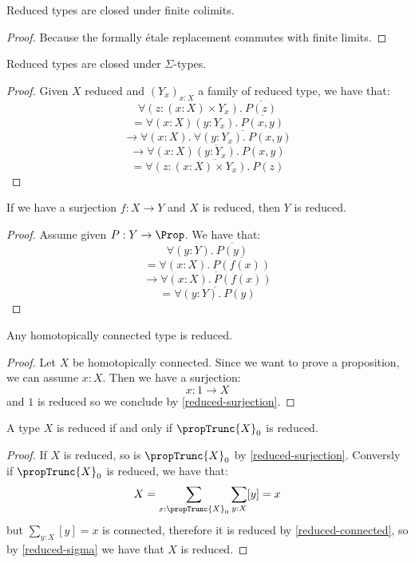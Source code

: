 \begin{lemma}\label{reduced-colimit}
Reduced types are closed under finite colimits.
\end{lemma}

\begin{proof}
Because the formally étale replacement commutes with finite limits.
\end{proof}

\begin{lemma}\label{reduced-sigma}
Reduced types are closed under $\Sigma$-types.
\end{lemma}

\begin{proof}
Given $X$ reduced and $(Y_x)_{x:X}$ a family of reduced type, we have that:
\[\forall (z:(x:X)\times Y_x).\ \overline{P(z)} \]
\[= \forall (x:X)(y:Y_x).\ \overline{P(x,y)} \]
\[\to \forall (x:X).\ \overline{\forall (y:Y_x).\ P(x,y)} \]
\[\to \overline{\forall (x:X)(y:Y_x).\ P(x,y)} \]
\[= \overline{\forall (z:(x:X)\times Y_x).\ P(z)}\]
\end{proof}

\begin{lemma}\label{reduced-surjection}
If we have a surjection $f:X\to Y$ and $X$ is reduced, then $Y$ is reduced.
\end{lemma}

\begin{proof}
Assume given $P:Y\to\Prop$. We have that:
\[\forall(y:Y).\ \overline{P(y)}\]
\[= \forall(x:X).\ \overline{P(f(x))}\]
\[\to \overline{\forall(x:X).\ P(f(x))}\]
\[= \overline{\forall(y:Y).\ P(y)}\]
\end{proof}

\begin{lemma}\label{reduced-connected}
Any homotopically connected type is reduced.
\end{lemma}

\begin{proof}
Let $X$ be homotopically connected. Since we want to prove a proposition, we can assume $x:X$. Then we have a surjection:
\[x:1\to X\]
and $1$ is reduced so we conclude by \cref{reduced-surjection}.
\end{proof}

\begin{lemma}
A type $X$ is reduced if and only if $\propTrunc{X}_0$ is reduced.
\end{lemma}

\begin{proof}
If $X$ is reduced, so is $\propTrunc{X}_0$ by \cref{reduced-surjection}. Conversly if $\propTrunc{X}_0$ is reduced, we have that:
\[X = \sum_{x:\propTrunc{X}_0} \sum_{y:X} [y] = x\]
but $\sum_{y:X} [y] = x$ is connected, therefore it is reduced by \cref{reduced-connected}, so by \cref{reduced-sigma} we have that $X$ is reduced.
\end{proof}

